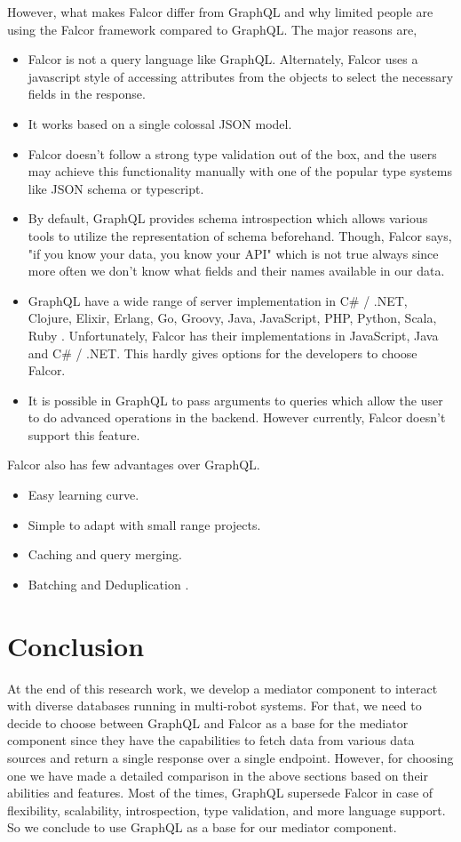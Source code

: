 	However, what makes Falcor differ from GraphQL and why limited people are using the Falcor framework compared to GraphQL. The major reasons are,
	\begin{itemize}
		\item Falcor is not a query language like GraphQL. Alternately, Falcor uses a javascript style of accessing attributes from the objects to select the necessary fields in the response.
		\item It works based on a single colossal JSON model.
		\item Falcor doesn't follow a strong type validation out of the box, and the users may achieve this functionality manually with one of the popular type systems like JSON schema or typescript.
		\item By default, GraphQL provides schema introspection which allows various tools to utilize the representation of schema beforehand. Though, Falcor says, "if you know your data, you know your API" \cite{misc04} which is not true always since more often we don't know what fields and their names available in our data.
		\item GraphQL have a wide range of server implementation in C\# / .NET, Clojure, Elixir, Erlang, Go, Groovy, Java, JavaScript, PHP, Python, Scala, Ruby \cite{misc05}. Unfortunately, Falcor has their implementations in JavaScript, Java and C\# / .NET. This hardly gives options for the developers to choose Falcor.
		\item It is possible in GraphQL to pass arguments to queries which allow the user to do advanced operations in the backend. However currently, Falcor doesn't support this feature.
	\end{itemize}

	Falcor also has few advantages over GraphQL. 
	\begin{itemize}
		\item Easy learning curve.
		\item Simple to adapt with small range projects.
		\item Caching and query merging.
		\item Batching and Deduplication \cite{misc06}.
	\end{itemize}

	\section{Conclusion}
	At the end of this research work, we develop a mediator component to interact with diverse databases running in multi-robot systems. For that, we need to decide to choose between GraphQL and Falcor as a base for the mediator component since they have the capabilities to fetch data from various data sources and return a single response over a single endpoint. However, for choosing one we have made a detailed comparison in the above sections based on their abilities and features. Most of the times, GraphQL supersede Falcor in case of flexibility, scalability, introspection, type validation, and more language support. So we conclude to use GraphQL as a base for our mediator component.

